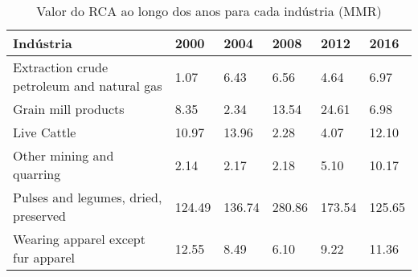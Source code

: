 \begin{table}
\centering
\caption{Valor do RCA ao longo dos anos para cada indústria (MMR)}
\label{tab:ex3-tempo-MMR}
\begin{tabular}{p{6cm}p{1.5cm}p{1.5cm}p{1.5cm}p{1.5cm}p{1.5cm}}
\toprule
                                 Indústria &   2000 &   2004 &   2008 &   2012 &   2016 \\
\midrule
Extraction crude petroleum and natural gas &   1.07 &   6.43 &   6.56 &   4.64 &   6.97 \\
                       Grain mill products &   8.35 &   2.34 &  13.54 &  24.61 &   6.98 \\
                               Live Cattle &  10.97 &  13.96 &   2.28 &   4.07 &  12.10 \\
                 Other mining and quarring &   2.14 &   2.17 &   2.18 &   5.10 &  10.17 \\
      Pulses and legumes, dried, preserved & 124.49 & 136.74 & 280.86 & 173.54 & 125.65 \\
        Wearing apparel except fur apparel &  12.55 &   8.49 &   6.10 &   9.22 &  11.36 \\
\bottomrule
\end{tabular}
\end{table}
